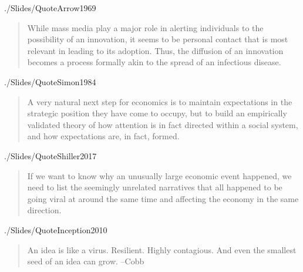 \begin{frontmatter}
\begin{verbatimwrite}{./Slides/QuoteArrow1969}%
  \begin{quote}
    While mass media play a major role in alerting individuals to the
    possibility of an innovation, it seems to be personal contact that is
    most relevant in leading to its adoption. Thus, the diffusion of an
    innovation becomes a process formally akin to the spread of an
    infectious disease.
  \end{quote}
\end{verbatimwrite} %

\begin{verbatimwrite}{./Slides/QuoteSimon1984}%
\begin{quote}
	A very natural next step for economics is to maintain expectations in
	the strategic position they have come to occupy, but to build an
	empirically validated theory of how attention is in fact directed within
	a social system, and how expectations are, in fact, formed.
\end{quote}
\end{verbatimwrite} %

\begin{verbatimwrite}{./Slides/QuoteShiller2017}%
  \begin{quote}
    If we want to know why an unusually large economic event happened, we
    need to list the seemingly unrelated narratives that all happened to be
    going viral at around the same time and affecting the economy in the
    same direction.
  \end{quote}
\end{verbatimwrite} %

\begin{verbatimwrite}{./Slides/QuoteInception2010}%
\begin{quote}
An idea is like a virus. Resilient. Highly contagious. And even the smallest seed of an idea can grow.   --Cobb


\end{quote}
\end{verbatimwrite}
\end{frontmatter}
